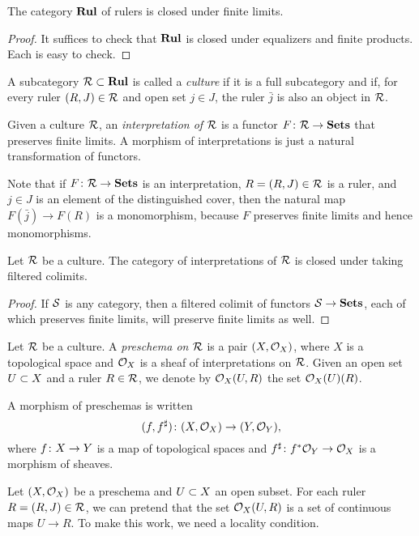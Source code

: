 \documentclass{amsart}
\def\Rul{{\bf Rul}}
\def\j{\bar{j}}
\begin{document}
\begin{lemma}

The category $\Rul$ of rulers is closed under finite limits.  

\end{lemma}

\begin{proof}

It suffices to check that $\Rul$ is closed under equalizers and finite products.  Each is easy to check.

\end{proof}

\begin{definition}

A subcategory $\mcR\ss\Rul$ is called a {\em culture} if it is a full subcategory and if, for every ruler $(R,J)\in\mcR$ and open set $j\in J$, the ruler $\j$ is also an object in $\mcR$.  

Given a culture $\mcR$, an {\em interpretation of $\mcR$} is a functor $F\taking\mcR\to\Sets$ that preserves finite limits.  A morphism of interpretations is just a natural transformation of functors.

\end{definition}

Note that if $F\taking\mcR\to\Sets$ is an interpretation, $R=(R,J)\in\mcR$ is a ruler, and $j\in J$ is an element of the distinguished cover, then the natural map $F(\bar{j})\to F(R)$ is a monomorphism, because $F$ preserves finite limits and hence monomorphisms.

\begin{lemma}

Let $\mcR$ be a culture.  The category of interpretations of $\mcR$ is closed under taking filtered colimits.

\end{lemma}

\begin{proof}

If $\mcS$ is any category, then a filtered colimit of functors $\mcS\to\Sets$, each of which preserves finite limits, will preserve finite limits as well.

\end{proof}

\begin{definition}

Let $\mcR$ be a culture.  A {\em preschema on $\mcR$} is a pair $(X,\mcO_X)$, where $X$ is a topological space and $\mcO_X$ is a sheaf of interpretations on $\mcR$.  Given an open set $U\ss X$ and a ruler $R\in\mcR$, we denote by $\mcO_X(U,R)$ the set $\mcO_X(U)(R)$.  

A morphism of preschemas is written $$(f,f^\sharp)\taking(X,\mcO_X)\to(Y,\mcO_Y),$$ where $f\taking X\to Y$ is a map of topological spaces and $f^\sharp\taking f^*\mcO_Y\to\mcO_X$ is a morphism of sheaves.

\end{definition}

Let $(X,\mcO_X)$ be a preschema and $U\ss X$ an open subset. For each ruler $R=(R,J)\in\mcR$, we can pretend that the set $\mcO_X(U,R)$ is a set of continuous maps $U\to R$.   To make this work, we need a locality condition.
\end{document}
